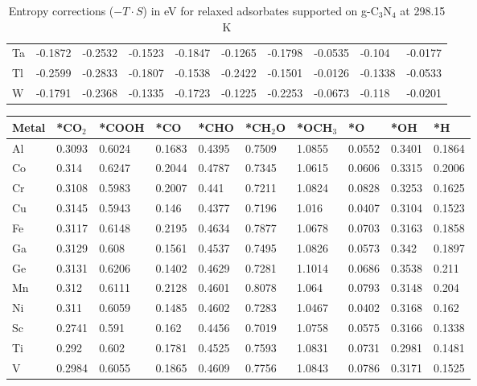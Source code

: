 \begin{table}[h]
{\begin{tabular}{*{10}{l}}
      Ta & -0.1872 & -0.2532 & -0.1523 & -0.1847 & -0.1265 & -0.1798 & -0.0535 & -0.104  & -0.0177 \\
      Tl & -0.2599 & -0.2833 & -0.1807 & -0.1538 & -0.2422 & -0.1501 & -0.0126 & -0.1338 & -0.0533 \\
      W  & -0.1791 & -0.2368 & -0.1335 & -0.1723 & -0.1225 & -0.2253 & -0.0673 & -0.118  & -0.0201 \\
      \hline
  \end{tabular}
  }
  \caption{Entropy corrections ($-T \cdot S$) in eV for relaxed adsorbates supported on g-C$_3$N$_4$ at 298.15 K}
  \label{si_table8}
\end{table}


\begin{table}[h]
  \centering
  {\fontsize{6}{12}\selectfont
  \begin{tabular}{*{10}{l}}
      \hline
      Metal & *CO$_2$ & *COOH & *CO & *CHO   & *CH$_2$O & *OCH$_3$ & *O & *OH    & *H     \\
      \hline
      Al & 0.3093 & 0.6024 & 0.1683 & 0.4395 & 0.7509 & 1.0855 & 0.0552 & 0.3401 & 0.1864 \\
      Co & 0.314  & 0.6247 & 0.2044 & 0.4787 & 0.7345 & 1.0615 & 0.0606 & 0.3315 & 0.2006 \\
      Cr & 0.3108 & 0.5983 & 0.2007 & 0.441  & 0.7211 & 1.0824 & 0.0828 & 0.3253 & 0.1625 \\
      Cu & 0.3145 & 0.5943 & 0.146  & 0.4377 & 0.7196 & 1.016  & 0.0407 & 0.3104 & 0.1523 \\
      Fe & 0.3117 & 0.6148 & 0.2195 & 0.4634 & 0.7877 & 1.0678 & 0.0703 & 0.3163 & 0.1858 \\
      Ga & 0.3129 & 0.608  & 0.1561 & 0.4537 & 0.7495 & 1.0826 & 0.0573 & 0.342  & 0.1897 \\
      Ge & 0.3131 & 0.6206 & 0.1402 & 0.4629 & 0.7281 & 1.1014 & 0.0686 & 0.3538 & 0.211  \\
      Mn & 0.312  & 0.6111 & 0.2128 & 0.4601 & 0.8078 & 1.064  & 0.0793 & 0.3148 & 0.204  \\
      Ni & 0.311  & 0.6059 & 0.1485 & 0.4602 & 0.7283 & 1.0467 & 0.0402 & 0.3168 & 0.162  \\
      Sc & 0.2741 & 0.591  & 0.162  & 0.4456 & 0.7019 & 1.0758 & 0.0575 & 0.3166 & 0.1338 \\
      Ti & 0.292  & 0.602  & 0.1781 & 0.4525 & 0.7593 & 1.0831 & 0.0731 & 0.2981 & 0.1481 \\
      V  & 0.2984 & 0.6055 & 0.1865 & 0.4609 & 0.7756 & 1.0843 & 0.0786 & 0.3171 & 0.1525 \\

\end{tabular}}
\end{table}
